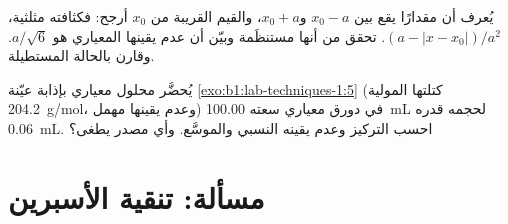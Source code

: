 \begin{exercise}[$\star\star\star$]\label{exo:b1:lab-techniques-1:11}
يُعرف أن مقدارًا يقع بين $x_0 - a$ و$x_0 + a$، والقيم القريبة من
$x_0$ أرجح: فكثافته مثلثية، $(a - |x - x_0|)/a^2$.
تحقق من أنها مستنظَمة وبيّن أن عدم يقينها المعياري هو
$a/\sqrt6$. وقارن بالحالة المستطيلة.
\end{exercise}

\begin{exercise}[$\star\star\star$]\label{exo:b1:lab-techniques-1:12}
يُحضَّر محلول معياري بإذابة عيّنة
\cref{exo:b1:lab-techniques-1:5} (كتلتها المولية \qty{204.2}{g/mol}،
وعدم يقينها مهمل) في دورق معياري سعته \qty{100.00}{mL} لحجمه
 قدره \qty{0.06}{mL}. احسب
التركيز وعدم يقينه النسبي والموسَّع. وأي مصدر
يطغى؟
\end{exercise}

\section{مسألة: تنقية الأسبرين}

